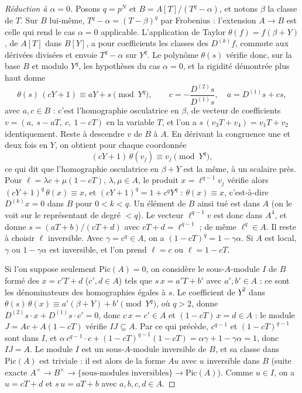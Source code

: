 \begin{proof}[Réduction à $\alpha = 0$]
Posons $q = p^N$ et $B = A[T]/(T^q - \alpha)$, et notons $\beta$ la classe de $T$. Sur $B$ lui-même, $T^q - \alpha = (T - \beta)^q$ par Frobenius : l'extension $A \to B$ est celle qui rend le cas $\alpha = 0$ applicable. L'application de Taylor $\theta(f) = f(\beta + Y)$, de $A[T]$ dans $B[Y]$, a pour coefficients les classes des $D^{(k)}f$, commute aux dérivées divisées et envoie $T^q - \alpha$ sur $Y^q$. Le polynôme $\theta(s)$ vérifie donc, sur la base $B$ et modulo $Y^q$, les hypothèses du cas $\alpha = 0$, et la rigidité démontrée plus haut donne
\[
\theta(s)\,(cY + 1) \equiv aY + s \pmod{Y^q}, \qquad c = -\frac{D^{(2)}s}{D^{(1)}s}, \quad a = D^{(1)}s + cs ,
\]
avec $a, c \in B$ : c'est l'homographie osculatrice en $\beta$, de vecteur de coefficients $v = (a,\ s - aT,\ c,\ 1 - cT)$ en la variable $T$, et l'on a $s\,(v_3 T + v_4) = v_1 T + v_2$ identiquement. Reste à descendre $v$ de $B$ à $A$. En dérivant la congruence une et deux fois en $Y$, on obtient pour chaque coordonnée
\[
(cY + 1)\,\theta(v_j) \equiv v_j \pmod{Y^q},
\]
ce qui dit que l'homographie osculatrice en $\beta + Y$ est la même, à un scalaire près. Pour $\ell = \lambda c + \mu (1 - cT)$, $\lambda, \mu \in A$, le produit $x = \ell^{q-1} v_j$ vérifie alors $(cY + 1)^q\,\theta(x) \equiv x$, et $(cY + 1)^q = 1 + c^q Y^q$ : $\theta(x) \equiv x$, c'est-à-dire $D^{(k)} x = 0$ dans $B$ pour $0 < k < q$. Un élément de $B$ ainsi tué est dans $A$ (on le voit sur le représentant de degré $< q$). Le vecteur $\ell^{q-1} v$ est donc dans $A^4$, et donne $s = (aT + b)/(cT + d)$ avec $cT + d = \ell^{q-1}$ ; de même $\ell^q \in A$. Il reste à choisir $\ell$ inversible. Avec $\gamma = c^q \in A$, on a $(1 - cT)^q = 1 - \gamma\alpha$. Si $A$ est local, $\gamma$ ou $1 - \gamma\alpha$ est inversible, et l'on prend $\ell = c$ ou $\ell = 1 - cT$.

Si l'on suppose seulement $\mathrm{Pic}(A) = 0$, on considère le sous-$A$-module $I$ de $B$ formé des $x = c'T + d$ ($c', d \in A$) tels que $s\,x = a'T + b'$ avec $a', b' \in A$ : ce sont les dénominateurs des homographies égales à $s$. Le coefficient de $Y^2$ dans $\theta(s)\,\theta(x) \equiv a'(\beta + Y) + b' \pmod{Y^q}$, où $q > 2$, donne $D^{(2)}s\cdot x + D^{(1)}s\cdot c' = 0$, donc $c\,x = c' \in A$ et $(1 - cT)\,x = d \in A$ : le module $J = Ac + A(1 - cT)$ vérifie $IJ \subseteq A$. Par ce qui précède, $c^{q-1}$ et $(1 - cT)^{q-1}$ sont dans $I$, et $\alpha\,c^{q-1}\cdot c + (1 - cT)^{q-1}(1 - cT) = \alpha\gamma + 1 - \gamma\alpha = 1$, donc $IJ = A$. Le module $I$ est un sous-$A$-module inversible de $B$, et sa classe dans $\mathrm{Pic}(A)$ est triviale : il est alors de la forme $Au$ avec $u$ inversible dans $B$ (suite exacte $A^\times \to B^\times \to \{\text{sous-modules inversibles}\} \to \mathrm{Pic}(A)$). Comme $u \in I$, on a $u = cT + d$ et $s\,u = aT + b$ avec $a, b, c, d \in A$.
\end{proof}

